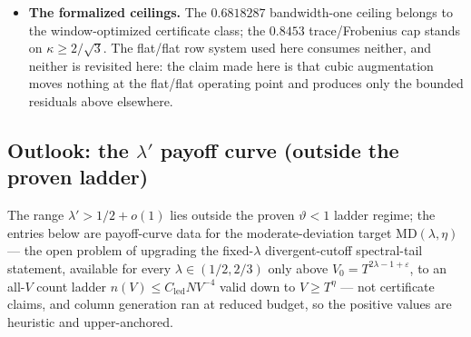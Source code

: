 \documentclass[11pt]{article}
\theoremstyle{plain}
\theoremstyle{definition}
\theoremstyle{remark}
\newcommand{\Cled}{C_{\mathrm{led}}}
\begin{document}
\begin{itemize}
  covered by numerics plus the $8/9$ backstop only --- not needed for any LP
  statement. (O3) The sharp conjecture
  (Section~\ref{sec:pairchannel}) is open; near-tight configurations ($+0.03$)
  show that the constant is not easily improved. (O4) The certified capacity
  constants are at $N = 64$; the $N = 128$ re-run
  reproduces every identity and inequality with $\le {\sim}2.5\%$ drift in the
  headline certified constants (deep-tail table values, $y \ge 1.5$, drift up to
  ${\sim}8\%$), moves the deep-pair threshold of Theorem~\ref{thm:singlepair} from
  $d \ge 1.0$ to $d \ge 1.1$, and shows the
  near-endpoint ledger failure at $N = 128$ as well (smaller sliver, better capped
  constant $0.9633$). (O5) All pair-channel constants are for the flat
  $\lambda = 1$ window; none transfer to the MT-cosine window without
  recomputation --- consistent with that window's residual row above.
\item \textbf{The formalized ceilings.} The $0.6818287$
  bandwidth-one ceiling belongs to the window-optimized certificate class; the
  $0.8453$ trace/Frobenius cap stands on $\kappa \ge 2/\sqrt{3}$. The flat/flat
  row system used here consumes neither, and neither is revisited here: the
  claim made here is that cubic augmentation moves
  nothing at the flat/flat operating point and produces only the bounded residuals
  above elsewhere.
\end{itemize}

\subsection[Outlook: the lambda' payoff curve (outside the proven
ladder)]{Outlook: the $\lambda'$ payoff curve (outside the proven
ladder)}
\label{sec:payoff}

The range $\lambda' > 1/2 + o(1)$ lies outside the proven
$\vartheta < 1$ ladder regime; the entries below
are payoff-curve data for the moderate-deviation target
$\mathrm{MD}(\lambda, \eta)$ --- the open problem of upgrading the
fixed-$\lambda$ divergent-cutoff spectral-tail statement, available for every
$\lambda \in (1/2, 2/3)$ only above $V_0 = T^{2\lambda - 1 + \varepsilon}$, to an
all-$V$ count ladder $n(V) \le \Cled N V^{-4}$ valid down to $V \ge T^\eta$ ---
not certificate claims, and column generation ran at reduced budget, so the
positive values are heuristic and upper-anchored.
\end{document}
